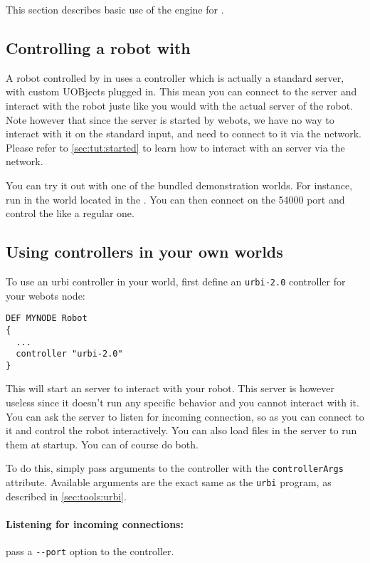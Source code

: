 This section describes basic use of the \urbi engine for \webots.

\subsection{Controlling a robot with \uwebots}

A robot controlled by \urbi in \webots uses a controller which is
actually a standard \urbi server, with custom UOBjects plugged
in. This mean you can connect to the \urbi server and interact with
the robot juste like you would with the actual \urbi server of the
robot. Note however that since the \urbi server is started by webots,
we have no way to interact with it on the standard input, and need to
connect to it via the network. Please refer to
\autoref{sec:tut:started} to learn how to interact with an \urbi
server via the network.

You can try it out with one of the bundled demonstration worlds. For
instance, run in \webots the  world
located in the \webotsworldsdir. You can then connect on the 54000
port and control the \aibo like a regular one.

\subsection{Using \urbi controllers in your own worlds}

To use an urbi controller in your \webots world, first define an
\verb+urbi-2.0+ controller for your webots node:

\begin{lstlisting}
DEF MYNODE Robot
{
  ...
  controller "urbi-2.0"
}
\end{lstlisting}

This will start an \urbi server to interact with your robot. This
server is however useless since it doesn't run any specific behavior
and you cannot interact with it. You can ask the \urbi server to
listen for incoming connection, so as you can connect to it and
control the robot interactively. You can also load \us files in the
server to run them at startup. You can of course do both.

To do this, simply pass arguments to the controller with the
\verb+controllerArgs+ \webots attribute. Available arguments are the
exact same as the \verb+urbi+ program, as described in
\autoref{sec:tools:urbi}.

\paragraph{Listening for incoming connections:} pass a \verb+--port+
option to the controller.

